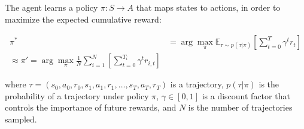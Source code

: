 The agent learns a policy $\pi: S \to A$ that maps states to actions, in order to maximize the expected cumulative reward:

\begin{equation}
    \label{rl_objective}
    \begin{aligned}
    \pi^* &= \arg\max_{\pi} \mathbb{E}_{\tau \sim p(\tau | \pi)} \left[ \sum_{t=0}^T \gamma^t r_t \right] \\
    \approx \pi' = \arg\max_{\pi} \frac{1}{N} \sum_{i=1}^N \left[ \sum_{t=0}^{T_i} \gamma^t r_{i,t} \right]
    \end{aligned}
\end{equation}

where $\tau = (s_0, a_0, r_0, s_1, a_1, r_1, \ldots, s_T, a_T, r_T)$ is a trajectory, $p(\tau | \pi)$ is the probability of a trajectory 
under policy $\pi$, $\gamma \in [0,1]$ is a discount factor that controls the importance of future rewards, and $N$ is the number of trajectories sampled.

